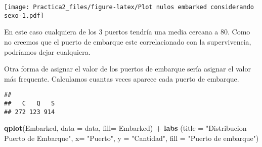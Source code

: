 \documentclass[]{article}
\newenvironment{Shaded}{\begin{snugshade}}{\end{snugshade}}
\newcommand{\KeywordTok}[1]{\textcolor[rgb]{0.13,0.29,0.53}{\textbf{#1}}}
\newcommand{\DataTypeTok}[1]{\textcolor[rgb]{0.13,0.29,0.53}{#1}}
\newcommand{\DecValTok}[1]{\textcolor[rgb]{0.00,0.00,0.81}{#1}}
\newcommand{\StringTok}[1]{\textcolor[rgb]{0.31,0.60,0.02}{#1}}
\newcommand{\OperatorTok}[1]{\textcolor[rgb]{0.81,0.36,0.00}{\textbf{#1}}}
\newcommand{\NormalTok}[1]{#1}
\begin{document}
\begin{Shaded}
\end{Shaded}

\texttt{[image: Practica2\_files/figure-latex/Plot nulos embarked considerando sexo-1.pdf]}

En este caso cualquiera de los 3 puertos tendría una media cercana a 80.
Como no creemos que el puerto de embarque este correlacionado con la
supervivencia, podríamos dejar cualquiera.

Otra forma de asignar el valor de los puertos de embarque sería asignar
el valor más frequente. Calculamos cuantas veces aparece cada puerto de
embarque.

\begin{Shaded}
\end{Shaded}

\begin{verbatim}
## 
##   C   Q   S 
## 272 123 914
\end{verbatim}

\begin{Shaded}
\begin{Highlighting}[]
\KeywordTok{qplot}\NormalTok{(Embarked, }\DataTypeTok{data =}\NormalTok{ data,  }\DataTypeTok{fill=}\NormalTok{ Embarked) }\OperatorTok{+}\StringTok{ }
\StringTok{  }\KeywordTok{labs}\NormalTok{ (}\DataTypeTok{title =} \StringTok{"Distribucion Puerto de Embarque"}\NormalTok{, }
        \DataTypeTok{x=} \StringTok{"Puerto"}\NormalTok{, }\DataTypeTok{y =} \StringTok{"Cantidad"}\NormalTok{, }\DataTypeTok{fill =} \StringTok{"Puerto de embarque"}\NormalTok{)}
\end{Highlighting}
\end{Shaded}
\end{document}
